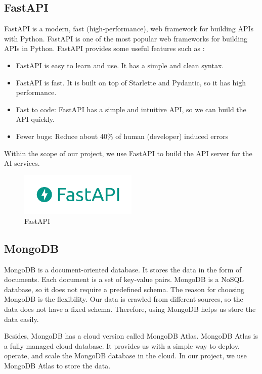 \subsection{FastAPI}
FastAPI is a modern, fast (high-performance), web framework for building APIs with Python. FastAPI is one of the most popular web frameworks for building APIs in Python. FastAPI provides some useful features such as \cite{fastapi}:
\begin{itemize}
    \item FastAPI is easy to learn and use. It has a simple and clean syntax.
    \item FastAPI is fast. It is built on top of Starlette and Pydantic, so it has high performance.
    \item Fast to code: FastAPI has a simple and intuitive API, so we can build the API quickly.
    \item Fewer bugs: Reduce about 40\% of human (developer) induced errors
\end{itemize} 

\noindent Within the scope of our project, we use FastAPI to build the API server for the AI services. 

\begin{figure}[ht]
    \centering
    \includegraphics[width=0.5\textwidth]{Images/8.Technology_Stack/fastapi_logo.png}
    \caption{FastAPI}
    \label{fig:fastapi}
\end{figure}

\subsection{MongoDB}
MongoDB is a document-oriented database. It stores the data in the form of documents. Each document is a set of key-value pairs. MongoDB is a NoSQL database, so it does not require a predefined schema. The reason for choosing MongoDB is the flexibility. Our data is crawled from different sources, so the data does not have a fixed schema. Therefore, using MongoDB helps us store the data easily.

Besides, MongoDB has a cloud version called MongoDB Atlas. MongoDB Atlas is a fully managed cloud database. It provides us with a simple way to deploy, operate, and scale the MongoDB database in the cloud. In our project, we use MongoDB Atlas to store the data.

